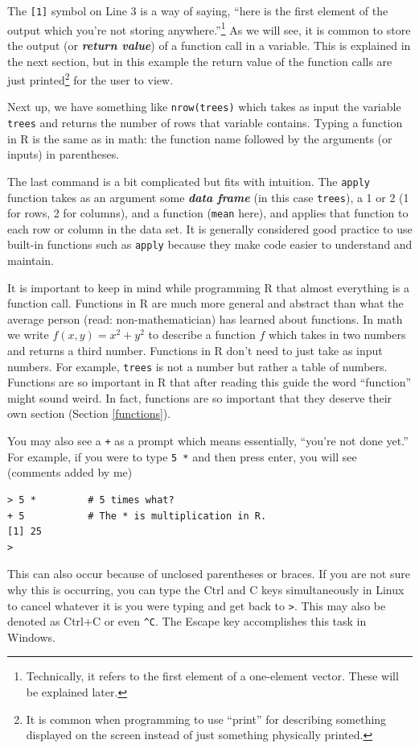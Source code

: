\documentclass[12pt]{article}
\theoremstyle{remark}
\newcommand{\vocab}[1]{\textbf{\emph{#1}}}
\begin{document}
The \verb|[1]| symbol on Line 3 is a way of saying, ``here is the first element of the output which you're not storing anywhere.''\footnote{Technically, it refers to the first element of a one-element vector. These will be explained later.} As we will see, it is common to store the output (or \vocab{return value}) of a function call in a variable. This is explained in the next section, but in this example the return value of the function calls are just printed\footnote{It is common when programming to use ``print'' for describing something displayed on the screen instead of just something physically printed.} for the user to view.

Next up, we have something like \verb|nrow(trees)| which takes as input the variable \verb|trees| and returns the number of rows that variable contains. Typing a function in R is the same as in math: the function name followed by the arguments (or inputs) in parentheses. 

The last command is a bit complicated but fits with intuition. The \verb|apply| function takes as an argument some \vocab{data frame} (in this case \verb|trees|), a 1 or 2 (1 for rows, 2 for columns), and a function (\verb|mean| here), and applies that function to each row or column in the data set. It is generally considered good practice to use built-in functions such as \verb|apply| because they make code easier to understand and maintain.

It is important to keep in mind while programming R that almost everything is a function call. Functions in R are much more general and abstract than what the average person (read: non-mathematician) has learned about functions. In math we write $f(x, y) = x^2 + y^2$ to describe a function $f$ which takes in two numbers and returns a third number. Functions in R don't need to just take as input numbers. For example, \verb|trees| is not a number but rather a table of numbers. Functions are so important in R that after reading this guide the word ``function'' might sound weird. In fact, functions are so important that they deserve their own section (Section \ref{functions}).

You may also see a \verb|+| as a prompt which means essentially, ``you're not done yet.'' For example, if you were to type \verb|5 *| and then press enter, you will see (comments added by me)
\begin{verbatim}
> 5 *         # 5 times what?
+ 5           # The * is multiplication in R.
[1] 25
>
\end{verbatim}
This can also occur because of unclosed parentheses or braces. If you are not sure why this is occurring, you can type the Ctrl and C keys simultaneously in Linux to cancel whatever it is you were typing and get back to \verb|>|. This may also be denoted as Ctrl+C or even \verb|^C|. The Escape key accomplishes this task in Windows.
\end{document}
